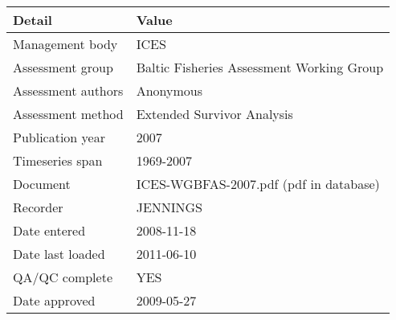 \begin{table}[htb]
\centering
\begin{tabular}{lp{7cm}}
\toprule
Detail & Value \\
\midrule
Management body    & ICES                                      \\
Assessment group   & Baltic Fisheries Assessment Working Group \\
Assessment authors & Anonymous                                 \\
Assessment method  & Extended Survivor Analysis                \\
Publication year   & 2007                                      \\
Timeseries span    & 1969-2007                                 \\
Document           & ICES-WGBFAS-2007.pdf (pdf in database)    \\
Recorder           & JENNINGS                                  \\
Date entered       & 2008-11-18                                \\
Date last loaded   & 2011-06-10                                \\
QA/QC complete     & YES                                       \\
Date approved      & 2009-05-27                                \\
\bottomrule
\end{tabular}
\label{tab:assessdet}
\end{table}
